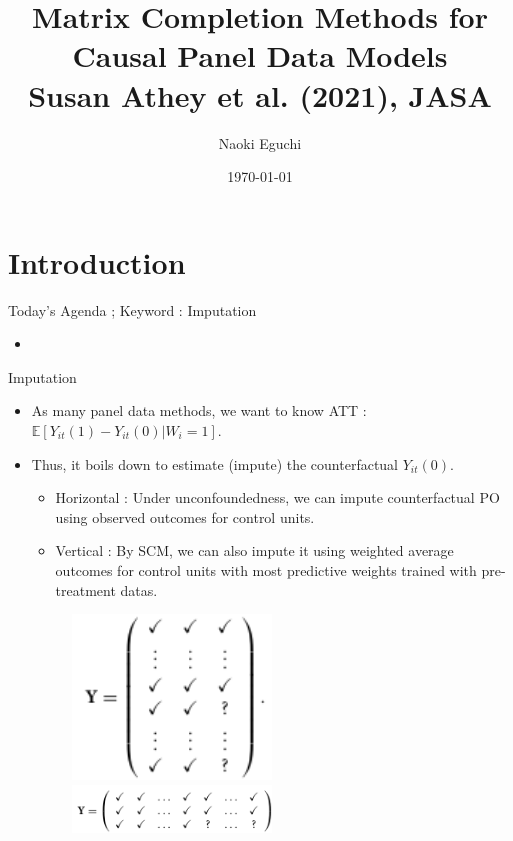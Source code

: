 \documentclass[xcolor=svgnames,aspectratio=169]{beamer}
\newcommand{\E}{\mathbb{E}}
\begin{document}
 

\title{Matrix Completion Methods for Causal Panel Data Models \\ \small{Susan Athey et al. (2021), JASA}}
\author{Naoki Eguchi}          
\date{\today}

\begin{frame}                  
    \titlepage                     
\end{frame}

\section{Introduction}

\begin{frame}{Today's Agenda ; Keyword : Imputation}
    \begin{itemize}
        \item
    \end{itemize}
\end{frame}

\begin{frame}{Imputation}
    \begin{itemize}
        \item As many panel data methods, we want to know ATT : $\E[Y_{it}(1)-Y_{it}(0)|W_i=1]$.
        \item Thus, it boils down to estimate (impute) the counterfactual $Y_{it}(0)$.
        \begin{itemize}
            \item Horizontal : Under unconfoundedness, we can impute counterfactual PO using observed outcomes for control units.
            \item Vertical : By SCM, we can also impute it using weighted average outcomes for control units with most predictive weights trained with pre-treatment datas.
        \end{itemize}
        \begin{figure}
            \includegraphics[width=0.5\textwidth, height=0.4\textheight, keepaspectratio]{Horizontal.png} \ 
            \includegraphics[width=0.5\textwidth, height=0.5\textheight, keepaspectratio]{Vertical.png}
        \end{figure}
    \end{itemize}
\end{frame}
\end{document}
